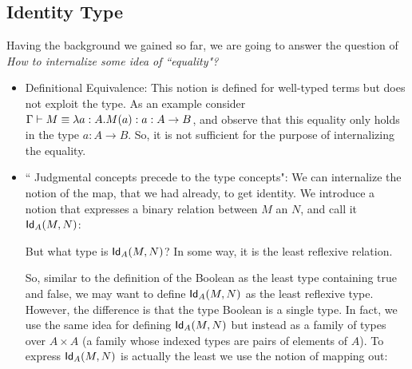 \documentclass{article}
\begin{document}
\subsection{Identity Type}
Having the background we gained so far, we are going to answer the question of {\it How to internalize some idea of ``equality"?}
\begin{itemize}
    \item Definitional Equivalence: This notion is defined for well-typed terms but does not exploit the type. As an example consider $\hasEF{\Gamma}{M \equiv \lambda a:A.M(a)}{a:A\rightarrow B}$, and observe that this equality only holds in the type ${a:A\rightarrow B}$. So, it is not sufficient for the purpose of internalizing the equality.
    \item `` Judgmental concepts precede to the type concepts": We can internalize the notion of the map, that we had already, to get identity. We introduce a notion that expresses a binary relation between $M$ an $N$, and call it $\sfid_A(M,N)$:
       \begin{mathpar}
  \end{mathpar} 
 But what type is $\sfid_A(M,N)$? In some way, it is the least reflexive relation. 
      \begin{mathpar}
  \end{mathpar}
  So, similar to the definition of the Boolean as the least type containing true and false, we may want to define $\sfid_A(M,N)$ as the least reflexive type. However, the difference is that the type Boolean is a single type. In fact, we use the same idea for defining $\sfid_A(M,N)$ but instead as a family of types over $A \times A$ (a family whose indexed types are pairs of elements of $A$). To express $\sfid_A(M,N)$ is actually the least we use the notion of mapping out:
         \begin{mathpar}

\end{mathpar}
\end{itemize}
\end{document}
